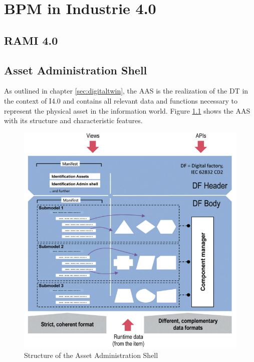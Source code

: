 \chapter{BPM in Industrie 4.0}
\section{RAMI 4.0}

\section{Asset Administration Shell} \label{sec:assetadministrationshell}
As outlined in chapter \ref{sec:digitaltwin}, the \ac{AAS} is the realization of the \ac{DT} in the context of \ac{I4.0} and contains all relevant data and functions necessary to represent the physical asset in the information world. Figure \ref{fig:structureaas} shows the \ac{AAS} with its structure and characteristic features.

\begin{figure}[h]
\centering
\includegraphics[scale=0.8]{content/pictures/structure_aas_zvei.png}
\caption{Structure of the Asset Administration Shell}
\label{fig:structureaas}
\end{figure}

